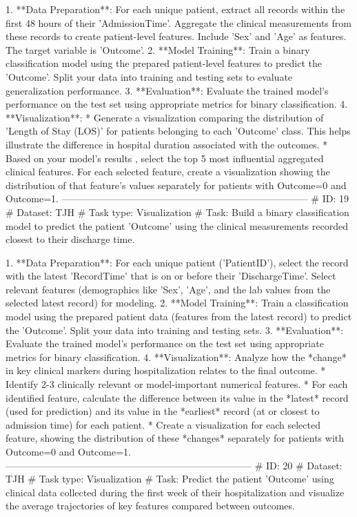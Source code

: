 \begin{tcolorbox}[colback=cadmiumgreen!5!white,colframe=forestgreen!75!white,breakable,title=\textit{Generated analytical tasks in task 4.}]
\begin{VerbatimWrap}
 1. **Data Preparation**: For each unique patient, extract all records within the first 48 hours of their 'AdmissionTime'. Aggregate the clinical measurements from these records to create patient-level features. Include 'Sex' and 'Age' as features. The target variable is 'Outcome'.
 2. **Model Training**: Train a binary classification model using the prepared patient-level features to predict the 'Outcome'. Split your data into training and testing sets to evaluate generalization performance.
 3. **Evaluation**: Evaluate the trained model's performance on the test set using appropriate metrics for binary classification.
 4. **Visualization**:
  * Generate a visualization comparing the distribution of 'Length of Stay (LOS)' for patients belonging to each 'Outcome' class. This helps illustrate the difference in hospital duration associated with the outcomes.
  * Based on your model's results , select the top 5 most influential aggregated clinical features. For each selected feature, create a visualization showing the distribution of that feature's values separately for patients with Outcome=0 and Outcome=1.
-----------------------------------------------------------------------------
# ID: 19  
# Dataset: TJH 
# Task type: Visualization
# Task: Build a binary classification model to predict the patient 'Outcome' using the clinical measurements recorded closest to their discharge time.
 
 1. **Data Preparation**: For each unique patient ('PatientID'), select the record with the latest 'RecordTime' that is on or before their 'DischargeTime'. Select relevant features (demographics like 'Sex', 'Age', and the lab values from the selected latest record) for modeling.
 2. **Model Training**: Train a classification model using the prepared patient data (features from the latest record) to predict the 'Outcome'. Split your data into training and testing sets.
 3. **Evaluation**: Evaluate the trained model's performance on the test set using appropriate metrics for binary classification.
 4. **Visualization**: Analyze how the *change* in key clinical markers during hospitalization relates to the final outcome.
  * Identify 2-3 clinically relevant or model-important numerical features.
  * For each identified feature, calculate the difference between its value in the *latest* record (used for prediction) and its value in the *earliest* record (at or closest to admission time) for each patient.
  * Create a visualization for each selected feature, showing the distribution of these *changes* separately for patients with Outcome=0 and Outcome=1.
-----------------------------------------------------------------------------
# ID: 20  
# Dataset: TJH 
# Task type: Visualization
# Task: Predict the patient 'Outcome' using clinical data collected during the first week of their hospitalization and visualize the average trajectories of key features compared between outcomes.
 

\end{VerbatimWrap}
\end{tcolorbox}
